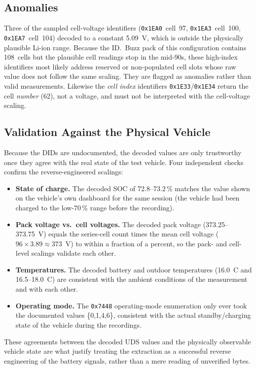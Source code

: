 \documentclass[11pt,a4paper,oneside,parskip=half]{scrreprt}
\providecommand{\hex}{}\renewcommand{\hex}[1]{\texttt{0x#1}}
\begin{document}
\subsection{Anomalies}
Three of the sampled cell-voltage identifiers (\hex{1EA0}~cell~97, \hex{1EA3}~cell~100, \hex{1EA7}~cell~104) decoded to a constant 5.09~V, which is outside the physically plausible Li-ion range. Because the ID.~Buzz pack of this configuration contains 108~cells but the plausible cell readings stop in the mid-90s, these high-index identifiers most likely address reserved or non-populated cell slots whose raw value does not follow the same scaling. They are flagged as anomalies rather than valid measurements. Likewise the \emph{cell index} identifiers \hex{1E33}/\hex{1E34} return the cell \emph{number} (62), not a voltage, and must not be interpreted with the cell-voltage scaling.

\subsection{Validation Against the Physical Vehicle}
Because the DIDs are undocumented, the decoded values are only trustworthy once they agree with the real state of the test vehicle. Four independent checks confirm the reverse-engineered scalings:

\begin{itemize}
  \item \textbf{State of charge.} The decoded SOC of 72.8--73.2\,\% matches the value shown on the vehicle's own dashboard for the same session (the vehicle had been charged to the low-70\,\% range before the recording).
  \item \textbf{Pack voltage vs.\ cell voltages.} The decoded pack voltage (373.25--373.75~V) equals the series-cell count times the mean cell voltage ($96\times3.89\approx373$~V) to within a fraction of a percent, so the pack- and cell-level scalings validate each other.
  \item \textbf{Temperatures.} The decoded battery and outdoor temperatures (16.0~\textdegree C and 16.5--18.0~\textdegree C) are consistent with the ambient conditions of the measurement and with each other.
  \item \textbf{Operating mode.} The \hex{7448} operating-mode enumeration only ever took the documented values \{0,1,4,6\}, consistent with the actual standby/charging state of the vehicle during the recordings.
\end{itemize}

These agreements between the decoded UDS values and the physically observable vehicle state are what justify treating the extraction as a successful reverse engineering of the battery signals, rather than a mere reading of unverified bytes.
\end{document}
